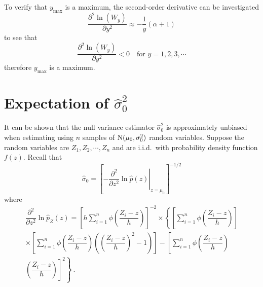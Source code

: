 To verify that $y_\text{max}$ is a maximum, the second-order derivative can be investigated
\begin{equation}
  \frac{\partial^2\ln(W_y)}{\partial y^2}
  \approx
  -\frac{1}{y}(\alpha+1)
\end{equation}
to see that
\begin{equation}
  \frac{\partial^2\ln(W_y)}{\partial y^2} < 0 \quad \text{for }y=1,2,3,\cdots
\end{equation}
therefore $y_\text{max}$ is a maximum.

\chapter{Expectation of $\widehat{\sigma}^2_0$}
\label{chapter:appendix_expectationNullStdEstimator}

It can be shown that the null variance estimator $\widehat{\sigma}_0^2$ is approximately unbiased when estimating using $n$ samples of $\operatorname{N}(\mu_0, \sigma_0^2)$ random variables. Suppose the random variables are $Z_1, Z_2, \cdots, Z_n$ and are i.i.d.~with probability density function $f(z)$. Recall that
\begin{equation}
  \widehat{\sigma}_0 = \left[
    \left.
      -\dfrac{\partial^2}{\partial z^2}\ln\widehat{p}(z)
    \right|_{z=\widehat{\mu}_0}
  \right]^{-1/2}
\end{equation}
where
\begin{multline}
  \dfrac{
    \partial^2
  }
  {
    \partial z^2
  }
  \ln\widehat{p}_Z(z)
  =
  \left[
    h\sum_{i=1}^n
    \phi\left(
      \dfrac{
        Z_i-z
      }
      {
        h
      }
    \right)
  \right]^{-2}
  \times
  \left\{
    \left[
      \sum_{i=1}^n
      \phi\left(
        \dfrac{
          Z_i-z
        }
        {
          h
        }
      \right)
    \right]
  \right.
  \\
  \left.
    \times
    \left[
      \sum_{i=1}^n
      \phi\left(
        \dfrac{
          Z_i-z
        }
        {
          h
        }
      \right)
      \left(
        \left(
          \dfrac{
            Z_i-z
          }
          {
            h
          }
        \right)^2
        -1
      \right)
    \right]
    -
    \left[
      \sum_{i=1}^n
      \phi\left(
        \dfrac{
          Z_i-z
        }
        {
          h
        }
      \right)
    \right.
  \right.
  \\
  \left.
    \left.
      \left(
        \dfrac{
          Z_i-z
        }
        {
          h
        }
      \right)
    \right]^2
  \right\}
  \ .
\end{multline}
